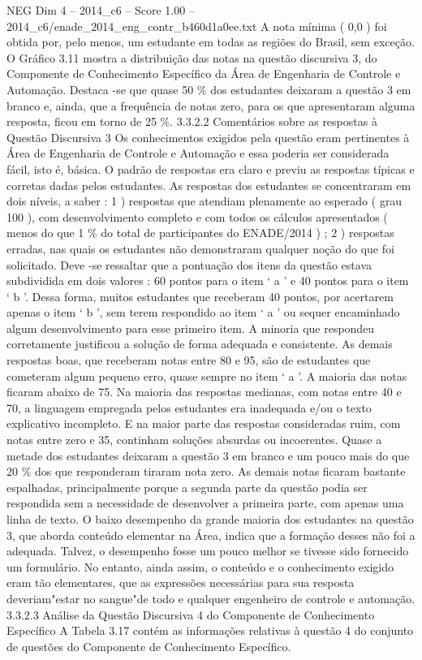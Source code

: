 \begin{textsample}{NEG Dim 4 – 2014\_c6 – Score 1.00 – 2014\_c6/enade\_2014\_eng\_contr\_b460d1a0ee.txt}
A nota mínima ( 0,0 ) foi obtida por, pelo menos, um estudante em todas as regiões do Brasil, sem exceção.
O Gráfico 3.11 mostra a distribuição das notas na questão discursiva 3, do Componente de Conhecimento Específico da Área de Engenharia de Controle e Automação.
Destaca -se que quase 50 \% dos estudantes deixaram a questão 3 em branco e, ainda, que a frequência de notas zero, para os que apresentaram alguma resposta, ficou em torno de 25 \%. 3.3.2.2 Comentários sobre as respostas à Questão Discursiva 3 Os conhecimentos exigidos pela questão eram pertinentes à Área de Engenharia de Controle e Automação e essa poderia ser considerada fácil, isto é, básica.
O padrão de respostas era claro e previu as respostas típicas e corretas dadas pelos estudantes.
As respostas dos estudantes se concentraram em dois níveis, a saber : 1 ) respostas que atendiam plenamente ao esperado ( grau 100 ), com desenvolvimento completo e com todos os cálculos apresentados ( menos do que 1 \% do total de participantes do ENADE/2014 ) ; 2 ) respostas erradas, nas quais os estudantes não demonstraram qualquer noção do que foi solicitado.
Deve -se ressaltar que a pontuação dos itens da questão estava subdividida em dois valores : 60 pontos para o item ‘ a ’ e 40 pontos para o item ‘ b ’.
Dessa forma, muitos estudantes que receberam 40 pontos, por acertarem apenas o item ‘ b ’, sem terem respondido ao item ‘ a ’ ou sequer encaminhado algum desenvolvimento para esse primeiro item.
A minoria que respondeu corretamente justificou a solução de forma adequada e consistente.
As demais respostas boas, que receberam notas entre 80 e 95, são de estudantes que cometeram algum pequeno erro, quase sempre no item ‘ a ’.
A maioria das notas ficaram abaixo de 75.
Na maioria das respostas medianas, com notas entre 40 e 70, a linguagem empregada pelos estudantes era inadequada e/ou o texto explicativo incompleto.
E na maior parte das respostas consideradas ruim, com notas entre zero e 35, continham soluções absurdas ou incoerentes.
Quase a metade dos estudantes deixaram a questão 3 em branco e um pouco mais do que 20 \% dos que responderam tiraram nota zero.
As demais notas ficaram bastante espalhadas, principalmente porque a segunda parte da questão podia ser respondida sem a necessidade de desenvolver a primeira parte, com apenas uma linha de texto.
O baixo desempenho da grande maioria dos estudantes na questão 3, que aborda conteúdo elementar na Área, indica que a formação desses não foi a adequada.
Talvez, o desempenho fosse um pouco melhor se tivesse sido fornecido um formulário.
No entanto, ainda assim, o conteúdo e o conhecimento exigido eram tão elementares, que as expressões necessárias para sua resposta deveriam"estar no sangue"de todo e qualquer engenheiro de controle e automação. 3.3.2.3 Análise da Questão Discursiva 4 do Componente de Conhecimento Específico A Tabela 3.17 contém as informações relativas à questão 4 do conjunto de questões do Componente de Conhecimento Específico.

\end{textsample}
